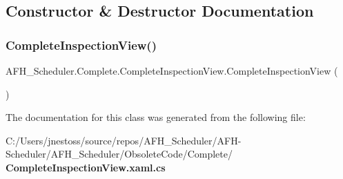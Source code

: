 \subsection{Constructor \& Destructor Documentation}
\mbox{\label{class_a_f_h___scheduler_1_1_complete_1_1_complete_inspection_view_a5f5a7f077b34963c04b506cf1651c71d}} 
\subsubsection{CompleteInspectionView()}
{\footnotesize\ttfamily A\+F\+H\+\_\+\+Scheduler.\+Complete.\+Complete\+Inspection\+View.\+Complete\+Inspection\+View (\begin{DoxyParamCaption}{ }\end{DoxyParamCaption})}



The documentation for this class was generated from the following file\+:\begin{DoxyCompactItemize}
\item 
C\+:/\+Users/jnestoss/source/repos/\+A\+F\+H\+\_\+\+Scheduler/\+A\+F\+H-\/\+Scheduler/\+A\+F\+H\+\_\+\+Scheduler/\+Obsolete\+Code/\+Complete/\textbf{ Complete\+Inspection\+View.\+xaml.\+cs}\end{DoxyCompactItemize}
